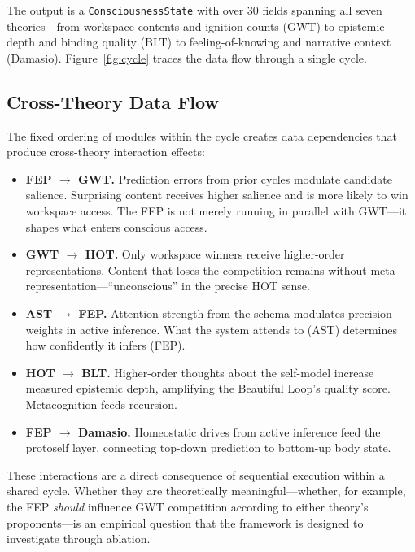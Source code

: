 The output is a \texttt{ConsciousnessState} with over 30 fields spanning all seven theories---from workspace contents and ignition counts (GWT) to epistemic depth and binding quality (BLT) to feeling-of-knowing and narrative context (Damasio). Figure~\ref{fig:cycle} traces the data flow through a single cycle.



\subsection{Cross-Theory Data Flow}
\label{sec:cross-theory}

The fixed ordering of modules within the cycle creates data dependencies that produce cross-theory interaction effects:

\begin{itemize}
    \item \textbf{FEP $\rightarrow$ GWT.} Prediction errors from prior cycles modulate candidate salience. Surprising content receives higher salience and is more likely to win workspace access. The FEP is not merely running in parallel with GWT---it shapes what enters conscious access.

    \item \textbf{GWT $\rightarrow$ HOT.} Only workspace winners receive higher-order representations. Content that loses the competition remains without meta-representation---``unconscious'' in the precise HOT sense.

    \item \textbf{AST $\rightarrow$ FEP.} Attention strength from the schema modulates precision weights in active inference. What the system attends to (AST) determines how confidently it infers (FEP).

    \item \textbf{HOT $\rightarrow$ BLT.} Higher-order thoughts about the self-model increase measured epistemic depth, amplifying the Beautiful Loop's quality score. Metacognition feeds recursion.

    \item \textbf{FEP $\rightarrow$ Damasio.} Homeostatic drives from active inference feed the protoself layer, connecting top-down prediction to bottom-up body state.
\end{itemize}

These interactions are a direct consequence of sequential execution within a shared cycle. Whether they are theoretically meaningful---whether, for example, the FEP \textit{should} influence GWT competition according to either theory's proponents---is an empirical question that the framework is designed to investigate through ablation.

